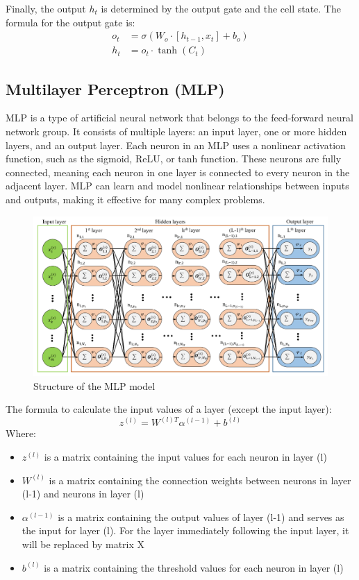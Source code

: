 \documentclass{ieeeojies}
\begin{document}
Finally, the output \( h_t \) is determined by the output gate and the cell state. The formula for the output gate is:
\begin{align*}
    o_t & = \sigma(W_o \cdot [h_{t-1}, x_t] + b_o) \\
    h_t & = o_t \cdot \tanh(C_t)
\end{align*}

\subsection{Multilayer Perceptron (MLP)}
MLP is a type of artificial neural network that belongs to the feed-forward neural network group. It consists of multiple layers: an input layer, one or more hidden layers, and an output layer. Each neuron in an MLP uses a nonlinear activation function, such as the sigmoid, ReLU, or tanh function. These neurons are fully connected, meaning each neuron in one layer is connected to every neuron in the adjacent layer. MLP can learn and model nonlinear relationships between inputs and outputs, making it effective for many complex problems. 
\begin{figure}[H]
  \centering
  \begin{minipage}{0.8\linewidth}
    \centering
    \includegraphics[width=\linewidth]{Figure_algorithm/mlp.png}
    \caption{Structure of the MLP model \cite{mlp_image}}
    \label{fig_mlp}
  \end{minipage}
\end{figure}
The formula to calculate the input values of a layer (except the input layer):
\[ z^{(l)} = W^{(l) T}\alpha^{(l-1)} + b^{(l)} \]
Where:
    \begin{itemize}
        \item $z^{(l)}$ is a matrix containing the input values for each neuron in layer (l)
        \item $W^{(l)}$ is a matrix containing the connection weights between neurons in layer (l-1) and neurons in layer (l)
        \item $\alpha^{(l-1)}$ is a matrix containing the output values of layer (l-1) and serves as the input for layer (l). For the layer immediately following the input layer, it will be replaced by matrix X
        \item $b^{(l)}$ is a matrix containing the threshold values for each neuron in layer (l)
    \end{itemize}
        
\end{document}

